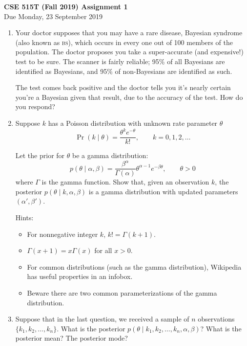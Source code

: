 \documentclass{article}
\newcommand{\acro}[1]{\textsc{\MakeLowercase{#1}}}
\newcommand{\given}{\mid}
\begin{document}
{\large \textbf{CSE 515T (Fall 2019) Assignment 1}} \\
Due Monday, 23 September 2019 \\

\begin{enumerate}

\item
  Your doctor supposes that you may have a rare disease, Bayesian
  syndrome (also known as \acro{BS}), which occurs in every one out of
  100 members of the population. The doctor proposes you take a
  super-accurate (and expensive!) test to be sure.  The scanner is
  fairly reliable; 95\% of all Bayesians are identified as Bayesians,
  and 95\% of non-Bayesians are identified as such.

  The test comes back positive and the doctor tells you it's nearly
  certain you're a Bayesian given that result, due to the accuracy of
  the test. How do you respond?

\item
  Suppose $k$ has a Poisson distribution with unknown rate parameter
  $\theta$
  \[
    \Pr(k \given \theta) = \frac{\theta^k e^{-\theta}}{k!},
    \qquad
    k = 0, 1, 2, \dotsc
  \]

  Let the prior for $\theta$ be a gamma distribution:
  \[
    p(\theta \given \alpha, \beta)
    =
    \frac{\beta^\alpha}
         {\Gamma(\alpha)}
    \theta^{\alpha - 1}e^{-\beta\theta},
    \qquad \theta > 0
  \]
  where $\Gamma$ is the gamma function.  Show that, given an
  observation $k$, the posterior $p(\theta \given k, \alpha, \beta)$
  is a gamma distribution with updated parameters $(\alpha', \beta')$.

  Hints:
  \begin{itemize}
  \item For nonnegative integer $k$, $k! = \Gamma(k + 1)$.
  \item $\Gamma(x + 1) = x\Gamma(x)$ for all $x > 0$.
  \item For common distributions (such as the gamma distribution),
    Wikipedia has useful properties in an infobox.
  \item Beware there are two common parameterizations of the gamma distribution.
  \end{itemize}

\item
  Suppose that in the last question, we received a sample of $n$
  observations $\{k_1, k_2, \dotsc, k_n\}$. What is the posterior
  $p(\theta \given k_1, k_2, \dotsc, k_n, \alpha, \beta)$? What is the
  posterior mean? The posterior mode?


\end{enumerate}
\end{document}
